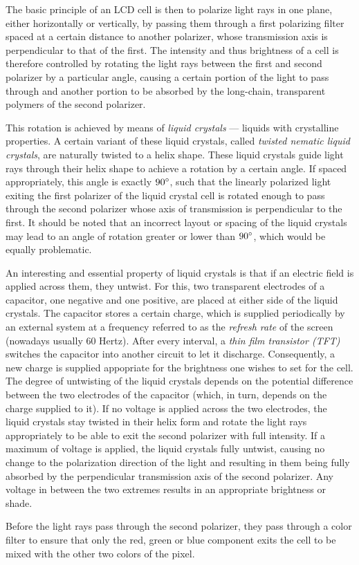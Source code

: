 The basic principle of an LCD cell is then to polarize light rays in one plane, either horizontally or vertically, by passing them through a first polarizing filter spaced at a certain distance to another polarizer, whose transmission axis is perpendicular to that of the first. The intensity and thus brightness of a cell is therefore controlled by rotating the light rays between the first and second polarizer by a particular angle, causing a certain portion of the light to pass through and another portion to be absorbed by the long-chain, transparent polymers of the second polarizer.

This rotation is achieved by means of \emph{liquid crystals} --- liquids with crystalline properties. A certain variant of these liquid crystals, called \emph{twisted nematic liquid crystals}, are naturally twisted to a helix shape. These liquid crystals guide light rays through their helix shape to achieve a rotation by a certain angle. If spaced appropriately, this angle is exactly $90\degree$, such that the linearly polarized light exiting the first polarizer of the liquid crystal cell is rotated enough to pass through the second polarizer whose axis of transmission is perpendicular to the first. It should be noted that an incorrect layout or spacing of the liquid crystals may lead to an angle of rotation greater or lower than $90\degree$, which would be equally problematic.

An interesting and essential property of liquid crystals is that if an electric field is applied across them, they untwist. For this, two transparent electrodes of a capacitor, one negative and one positive, are placed at either side of the liquid crystals. The capacitor stores a certain charge, which is supplied periodically by an external system at a frequency referred to as the \emph{refresh rate} of the screen (nowadays usually 60 Hertz). After every interval, a \emph{thin film transistor (TFT)} switches the capacitor into another circuit to let it discharge. Consequently, a new charge is supplied appopriate for the brightness one wishes to set for the cell. The degree of untwisting of the liquid crystals depends on the potential difference between the two electrodes of the capacitor (which, in turn, depends on the charge supplied to it). If no voltage is applied across the two electrodes, the liquid crystals stay twisted in their helix form and rotate the light rays appropriately to be able to exit the second polarizer with full intensity. If a maximum of voltage is applied, the liquid crystals fully untwist, causing no change to the polarization direction of the light and resulting in them being fully absorbed by the perpendicular transmission axis of the second polarizer. Any voltage in between the two extremes results in an appropriate brightness or shade. 

Before the light rays pass through the second polarizer, they pass through a color filter to ensure that only the red, green or blue component exits the cell to be mixed with the other two colors of the pixel.

